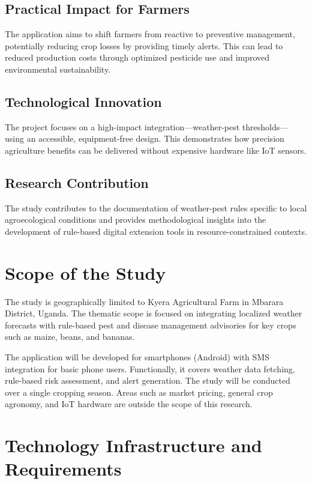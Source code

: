 \documentclass[12pt]{report}
\begin{document}
\subsection{Practical Impact for Farmers}
The application aims to shift farmers from reactive to preventive management, potentially reducing crop losses by providing timely alerts. This can lead to reduced production costs through optimized pesticide use and improved environmental sustainability.

\subsection{Technological Innovation}
The project focuses on a high-impact integration—weather-pest thresholds—using an accessible, equipment-free design. This demonstrates how precision agriculture benefits can be delivered without expensive hardware like IoT sensors.

\subsection{Research Contribution}
The study contributes to the documentation of weather-pest rules specific to local agroecological conditions and provides methodological insights into the development of rule-based digital extension tools in resource-constrained contexts.

\section{Scope of the Study}
The study is geographically limited to Kyera Agricultural Farm in Mbarara District, Uganda. The thematic scope is focused on integrating localized weather forecasts with rule-based pest and disease management advisories for key crops such as maize, beans, and bananas.

The application will be developed for smartphones (Android) with SMS integration for basic phone users. Functionally, it covers weather data fetching, rule-based risk assessment, and alert generation. The study will be conducted over a single cropping season. Areas such as market pricing, general crop agronomy, and IoT hardware are outside the scope of this research.

\section{Technology Infrastructure and Requirements}
\label{sec:tech-infrastructure}
\end{document}
